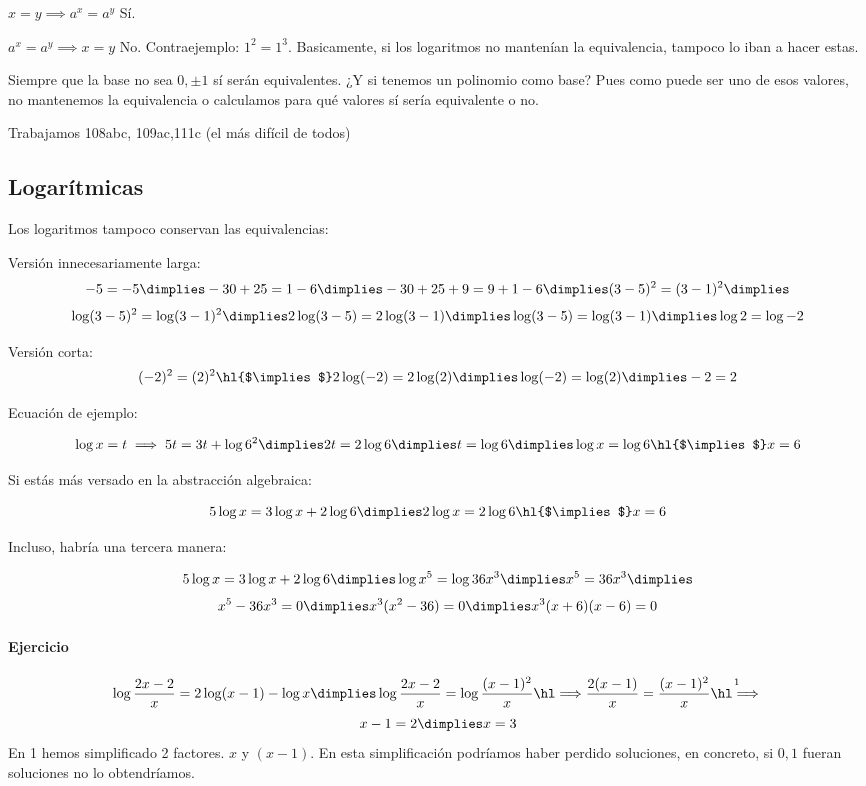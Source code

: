 $x=y\implies a^x=a^y$ Sí.

$a^x=a^y\implies x=y$ No. Contraejemplo: $1^2=1^3$.  Basicamente, si los logaritmos no mantenían la equivalencia, tampoco lo iban a hacer estas.

Siempre que la base no sea $0,±1$ sí serán equivalentes. ¿Y si tenemos un polinomio como base? Pues como puede ser uno de esos valores, no mantenemos la equivalencia o calculamos para qué valores sí sería equivalente o no.

Trabajamos 108abc, 109ac,111c (el más difícil de todos)

\subsection{Logarítmicas}

Los logaritmos tampoco conservan las equivalencias:

Versión innecesariamente larga:
\[
	-5 = -5 \dimplies -30+25 = 1-6 \dimplies -30+25+9 = 9+1-6 \dimplies (3-5)^2 = (3-1)^2 \dimplies 
\]
\[
	\log(3-5)^2 = \log(3-1)^2 \dimplies 2\log(3-5) = 2\log(3-1) \dimplies \log(3-5)=\log(3-1) \dimplies \log2=\log-2
\]

Versión corta:
\[
	(-2)^2 = (2)^2 \text{\hl{$\implies$}} 2\log(-2) = 2\log(2) \dimplies \log(-2) = \log(2) \dimplies -2=2
\]

Ecuación de ejemplo:


\[
	\log x=t \implies 5t=3t+\log6^2 \dimplies 2t=2\log6 \dimplies t=\log6 \dimplies \log x=\log6 \text{\hl{$\implies$}} x=6
\]

Si estás más versado en la abstracción algebraica:

\[
	5\log x=3\log x+2\log 6 \dimplies 2\log x=2\log6 \text{\hl{$\implies$}} x=6
\]


Incluso, habría una tercera manera:
 
\[
	5\log x=3\log x+2\log 6 \dimplies \log x^5=\log36x^3 \dimplies x^5=36x^3 \dimplies
\]
\[
	x^5-36x^3 = 0 \dimplies x^3(x^2-36) = 0 \dimplies x^3(x+6)(x-6) = 0
\]




\paragraph{Ejercicio}
\[
	\log\frac{2x-2}{x} = 2\log(x-1)-\log x \dimplies \log \frac{2x-2}{x}=\log\frac{(x-1)^2}{x} \cimplies \frac{2(x-1)}{x} = \frac{(x-1)^2}{x} \overset{1}{\cimplies}
	\]
	\[ 
	x-1=2 \dimplies x=3
\]
En 1 hemos simplificado 2 factores. $x$ y $(x-1)$. En esta simplificación podríamos haber perdido soluciones, en concreto, si $0,1$ fueran soluciones no lo obtendríamos. 

